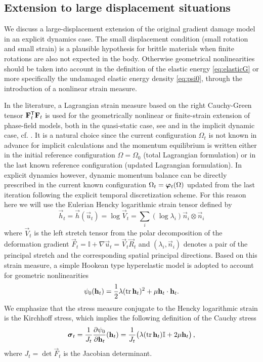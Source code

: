 \subsection{Extension to large displacement situations} \label{sec:extensions}
We discuss a large-displacement extension of the original gradient damage model in an explicit dynamics case. The small displacement condition (small rotation and small strain) is a plausible hypothesis for brittle materials when finite rotations are also not expected in the body. Otherwise geometrical nonlinearities should be taken into account in the definition of the elastic energy \eqref{eq:elasticG} or more specifically the undamaged elastic energy density \eqref{eq:psi0}, through the introduction of a nonlinear strain measure.

In the literature, a Lagrangian strain measure based on the right Cauchy-Green tensor $\vec{F}_t^\mT\vec{F}_t$ is used for the geometrically nonlinear or finite-strain extension of phase-field models, both in the quasi-static case, see \cite{PieroLancioniMarch:2007,ClaytonKnap:2014,MieheSchaenzel:2014,MieheSchaenzelUlmer:2015} and in the implicit dynamic case, cf. \cite{HeschWeinberg:2014,MieheHofackerSchaenzelAldakheel:2015}. It is a natural choice since the current configuration $\Omega_t$ is not known in advance for implicit calculations and the momentum equilibrium is written either in the initial reference configuration $\Omega=\Omega_0$ (total Lagrangian formulation) or in the last known reference configuration (updated Lagrangian formulation). In explicit dynamics however, dynamic momentum balance can be directly prescribed in the current known configuration $\Omega_t=\vphi_t(\Omega)$ updated from the last iteration following the explicit temporal discretization scheme. For this reason here we will use the Eulerian Hencky logarithmic strain tensor \cite{XiaoBruhnsMeyers:1997} defined by
\begin{equation} \label{eq:logstrain}
\vec{h}_t=\vec{h}(\vec{u}_t)=\log\vec{V}_t=\sum_i(\log\lambda_i)\vec{n}_i\otimes\vec{n}_i
\end{equation}
where $\vec{V}_t$ is the left stretch tensor from the polar decomposition of the deformation gradient $\vec{F}_t=\mathbb{I}+\nabla\vec{u}_t=\vec{V}_t\vec{R}_t$ and $(\lambda_i,\vec{n}_i)$ denotes a pair of the principal stretch and the corresponding spatial principal directions. Based on this strain measure, a simple Hookean type hyperelastic model \cite{XiaoChen:2002} is adopted to account for geometric nonlinearities
\begin{equation}
\psi_0(\vec{h}_t)=\frac{1}{2}\lambda(\tr\vec{h}_t)^2+\mu\vec{h}_t\cdot\vec{h}_t. \label{eq:soundpsi}
\end{equation}
We emphasize that the stress measure conjugate to the Hencky logarithmic strain is the Kirchhoff stress, which implies the following definition of the Cauchy stress
\begin{equation}
\sig_t=\frac{1}{J_t}\frac{\partial\psi_0}{\partial\vec{h}_t}(\vec{h}_t)=\frac{1}{J_t}\bigl(\lambda(\tr\vec{h}_t)\mathbb{I}+2\mu\vec{h}_t\bigr)\,,
\end{equation}
where $J_t=\det\vec{F}_t$ is the Jacobian determinant.

